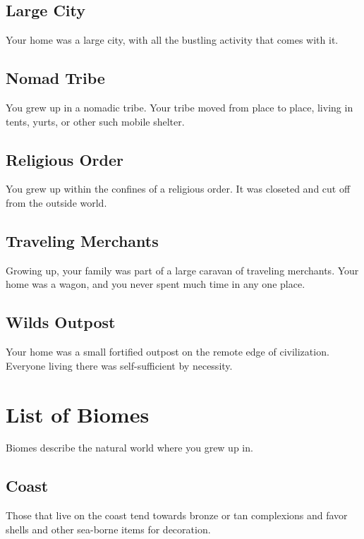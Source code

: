 \begin{multicols}{2}
\subsection{Large City}

Your home was a large city, with all the bustling activity that comes
with it.

\subsection{Nomad Tribe}

You grew up in a nomadic tribe. Your tribe moved from place to place,
living in tents, yurts, or other such mobile shelter.

\subsection{Religious Order}

You grew up within the confines of a religious order. It was closeted
and cut off from the outside world.

\subsection{Traveling Merchants}

Growing up, your family was part of a large caravan of traveling merchants.
Your home was a wagon, and you never spent much time in any one place.

\subsection{Wilds Outpost}

Your home was a small fortified outpost on the remote edge of civilization.
Everyone living there was self-sufficient by necessity.

\section{List of Biomes}

Biomes describe the natural world where you grew up in. 

\subsection{Coast}

Those that live on the coast tend towards bronze or tan complexions
and favor shells and other sea-borne items for decoration.


\end{multicols}
